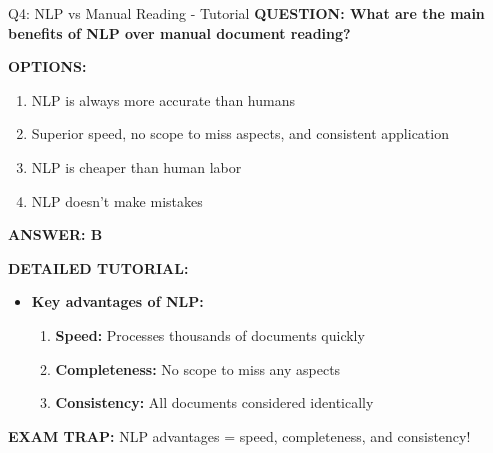 \documentclass[8pt]{beamer}
\begin{document}
	\begin{frame}{Q4: NLP vs Manual Reading - Tutorial}
		\fontsize{6.5}{7.5}\selectfont
		\textbf{QUESTION: What are the main benefits of NLP over manual document reading?}
		
		\vspace{0.1cm}
		\textbf{OPTIONS:}
		\begin{enumerate}
			\item NLP is always more accurate than humans
			\item Superior speed, no scope to miss aspects, and consistent application
			\item NLP is cheaper than human labor
			\item NLP doesn't make mistakes
		\end{enumerate}
		
		\vspace{0.1cm}
		\textcolor{myblue}{\textbf{ANSWER: B}}
		
		\vspace{0.1cm}
		\textbf{DETAILED TUTORIAL:}
		\begin{itemize}
			\item \textbf{Key advantages of NLP:}
			\begin{enumerate}
				\item \textbf{Speed:} Processes thousands of documents quickly
				\item \textbf{Completeness:} No scope to miss any aspects
				\item \textbf{Consistency:} All documents considered identically
			\end{enumerate}
		\end{itemize}
		
		\textcolor{myred}{\textbf{EXAM TRAP:}} NLP advantages = \textcolor{myblue}{speed, completeness, and consistency}!
	\end{frame}
	
\end{document}
